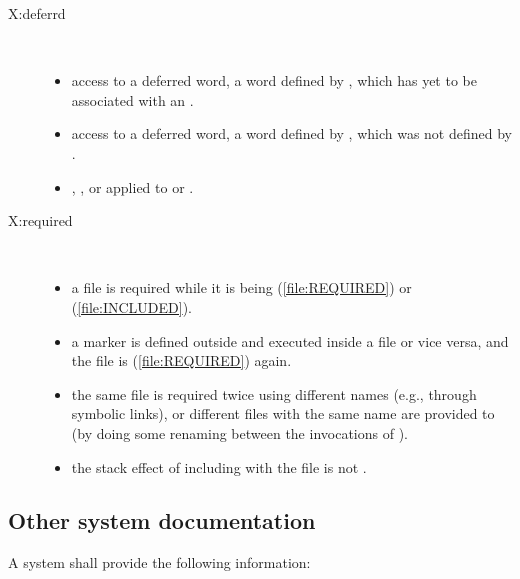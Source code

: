 \begin{description}


\item[\textsf{X:deferrd}] ~
	\begin{itemize}
\item access to a deferred word, a word defined by ,
	which has yet to be associated with an .

\item access to a deferred word, a word defined by ,
	which was not defined by .

\item {}, ,
	 or  applied to 
	or .
	\end{itemize}


\item[\textsf{X:required}] \cbstart{} ~
	\begin{itemize}
\item a file is required while it is being 
	(\ref{file:REQUIRED}) or  (\ref{file:INCLUDED}).

\item a marker is defined outside and executed inside a file or vice
	versa, and the file is  (\ref{file:REQUIRED})
	again.

\item the same file is required twice using different names (e.g.,
	through symbolic links), or different files with the same name are
	provided to  (by doing some renaming
	between the invocations of ).

\item the stack effect of including with 
	the file is not .
	\end{itemize}
\end{description}
\cbend

\subsection{Other system documentation} %

A system shall provide the following information:

